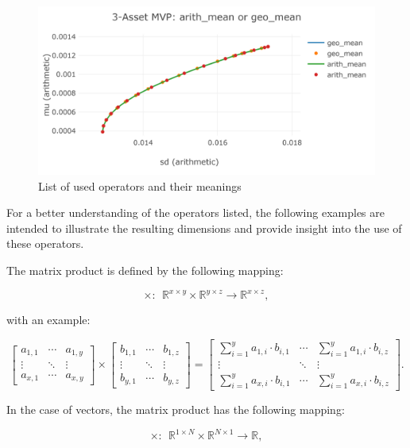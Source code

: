 \documentclass[
  oneside, a4paper, 12pt, openany]{book}
\theoremstyle{definition}
\theoremstyle{definition}
\theoremstyle{definition}
\theoremstyle{definition}
\theoremstyle{remark}
\begin{document}
\begin{figure}[H]
\includegraphics{Master_Thesis_files/figure-latex/unnamed-chunk-4-1} \caption{List of used operators and their meanings}\label{fig:unnamed-chunk-4}
\end{figure}

For a better understanding of the operators listed, the following examples are intended to illustrate the resulting dimensions and provide insight into the use of these operators.

The matrix product is defined by the following mapping:

\[\times: \ \ \mathbb{R}^{x \times y} \times \mathbb{R}^{y \times z} \rightarrow \mathbb{R}^{x \times z},\]

with an example:

\[ 
\begin{bmatrix}a_{1,1} &\cdots  & a_{1,y} \\ \vdots & \ddots & \vdots  \\ a_{x,1} & \cdots & a_{x,y} \end{bmatrix}
\times
\begin{bmatrix}b_{1,1} &\cdots  & b_{1,z} \\ \vdots & \ddots & \vdots  \\ b_{y,1} & \cdots & b_{y,z} \end{bmatrix}
=
\begin{bmatrix} \sum_{i=1}^y a_{1, i} \cdot  b_{i,1} &\cdots  & \sum_{i=1}^y a_{1, i} \cdot  b_{i,z} \\ \vdots & \ddots & \vdots  \\ \sum_{i=1}^y a_{x, i} \cdot  b_{i,1}  & \cdots & \sum_{i=1}^y a_{x, i} \cdot  b_{i,z} \end{bmatrix}.
\]

In the case of vectors, the matrix product has the following mapping:

\[\times: \ \ \mathbb{R}^{1 \times N} \times \mathbb{R}^{N \times 1} \rightarrow \mathbb{R},\]
\end{document}

